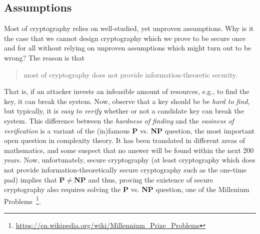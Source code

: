 \subsection{Assumptions}\label{ssec:assumptions}
Most of cryptography relies on well-studied, yet unproven assumptions. Why is it the case that we cannot design cryptography which we prove to be secure once and for all without relying on unproven assumptions which might turn out to be wrong? The reason is that
\begin{quote}
    most of cryptography does not provide information-theoretic security.
\end{quote}
That is, if an attacker invests an infeasible amount of resources, e.g., to find the key, it can break the system. Now, observe that a key should be be \emph{hard to find}, but typically, it is \emph{easy to verify} whether or not a candidate key can break the system. This difference between the \emph{hardness of finding} and the \emph{easiness of verification} is a variant of the (in)famous \textbf{P} vs. \textbf{NP} question, the most important open question in complexity theory. It has been translated in different areas of mathematics, and some suspect that no answer will be found within the next 200 years. Now, unfortunately, secure cryptography (at least cryptography which does not provide information-theoretically secure cryptography such as the one-time pad) implies that \textbf{P}$\neq$\textbf{NP} and thus, proving the existence of secure cryptography also requires solving the \textbf{P} vs. \textbf{NP} question, one of the Millenium Problems~\footnote{\url{https://en.wikipedia.org/wiki/Millennium_Prize_Problems}}.